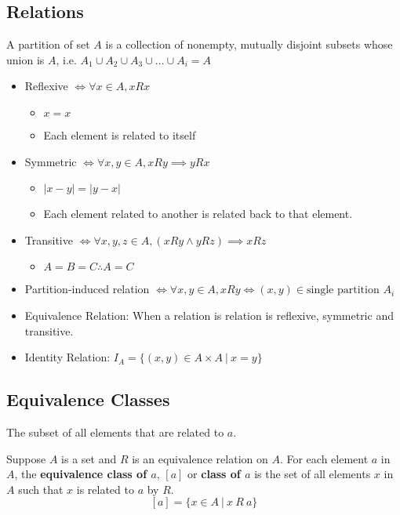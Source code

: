\documentclass[landscape, letterpaper]{article}
\begin{document}
\begin{multicols}{2}
    \section*{Relations}
    A partition of set $A$ is a collection of nonempty, mutually disjoint subsets whose union is $A$, i.e. $A_1 \cup A_2 \cup A_3 \cup \ldots \cup A_i = A$
    \begin{itemize}
        \item Reflexive $ \iff \forall x \in A, x R x$
              \begin{itemize}
                  \item $x=x$
                  \item Each element is related to itself
              \end{itemize}
        \item Symmetric $ \iff \forall x, y \in A, x R y \implies y R x$
              \begin{itemize}
                  \item $|x-y| = |y-x|$
                  \item Each element related to another is related back to that element.
              \end{itemize}
        \item Transitive $\iff \forall x, y, z \in A, (x R y \land y R z)\implies x R z$
              \begin{itemize}
                  \item $A = B = C \therefore A=C$
              \end{itemize}
        \item Partition-induced relation $\iff \forall x, y \in A, x R y \iff (x, y) \in \text{single partition }A_i$
        \item Equivalence Relation: When a relation is relation is reflexive, symmetric and transitive.
        \item Identity Relation: $I_A = \{(x, y) \in A \times A~|~x=y\}$
    \end{itemize}
    \subsection*{Equivalence Classes}
    The subset of all elements that are related to $a$.

    Suppose $A$ is a set and $R$ is an equivalence relation on $A$. For each element $a$ in $A$, the \textbf{equivalence class of $a$}, $[a]$ or \textbf{class of $a$} is the set of all elements $x$ in $A$ such that $x$ is related to $a$ by $R$. $$[a] = \{x \in A~|~x~R~a\}$$

\end{multicols}
\end{document}
